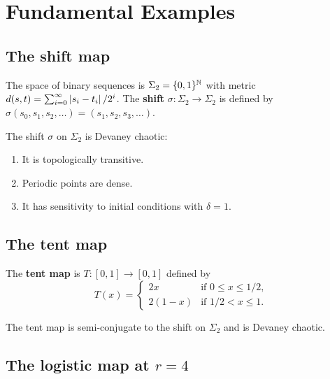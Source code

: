 \section{Fundamental Examples}

\subsection{The shift map}

\begin{definition}
The space of binary sequences is
$\Sigma_2 = \{0,1\}^{\mathbb{N}}$
with metric $d(s,t) = \sum_{i=0}^{\infty} \left| s_i - t_i \right|/2^i$. The
\textbf{shift} $\sigma : \Sigma_2 \to \Sigma_2$ is defined by
$\sigma(s_0, s_1, s_2, \ldots) = (s_1, s_2, s_3, \ldots)$.
\end{definition}

\begin{theorem}
The shift $\sigma$ on $\Sigma_2$ is Devaney chaotic:
\begin{enumerate}
    \item It is topologically transitive.
    \item Periodic points are dense.
    \item It has sensitivity to initial conditions with $\delta = 1$.
\end{enumerate}
\end{theorem}

\subsection{The tent map}

\begin{definition}
The \textbf{tent map} is $T : [0,1] \to [0,1]$ defined by
\[
    T(x) = \begin{cases} 2x & \text{if } 0 \leq x \leq 1/2, \\
    2(1-x) & \text{if } 1/2 < x \leq 1. \end{cases}
\]
\end{definition}

\begin{proposition}
The tent map is semi-conjugate to the shift on $\Sigma_2$ and is Devaney
chaotic.
\end{proposition}

\subsection{The logistic map at $r=4$}

